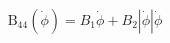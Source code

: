 \begin{equation}
\operatorname{B_{44}}\left(\dot{\phi}\right) = B_{1} \dot{\phi} + B_{2} \left|{\dot{\phi}}\right| \dot{\phi}
\end{equation}
